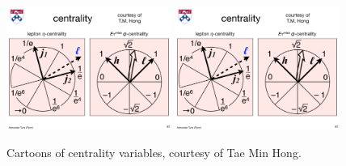 \begin{figure}[tp]
  \centering
  \includegraphics[width=0.48\textwidth]{figures/backgrounds/cartoon_lepton_eta_centrality}
  \includegraphics[width=0.48\textwidth]{figures/backgrounds/cartoon_met_phi_centrality}
  \caption{Cartoons of centrality variables, courtesy of Tae Min Hong.}
  \label{fig:strategy-centrality-cartoons}
\end{figure}

